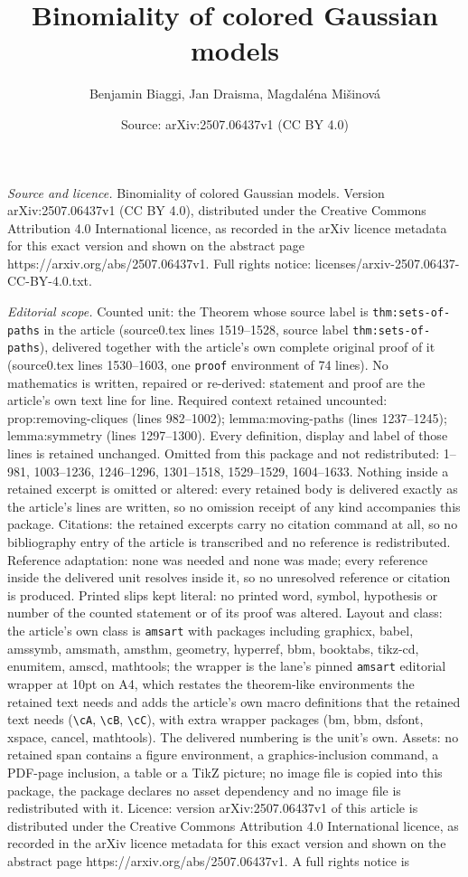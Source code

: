 \documentclass[10pt,a4paper]{amsart}
\title[Binomiality of colored Gaussian models]{Binomiality of colored Gaussian models}
\author{Benjamin Biaggi, Jan Draisma, Magdal\'ena Mi\v{s}inov\'a}
\date{Source: arXiv:2507.06437v1 (CC BY 4.0)}
\begin{document}
\maketitle

\noindent\emph{Source and licence.} Binomiality of colored Gaussian models. Version arXiv:2507.06437v1 (CC BY 4.0), distributed under the Creative Commons Attribution 4.0 International licence, as recorded in the arXiv licence metadata for this exact version and shown on the abstract page https://arxiv.org/abs/2507.06437v1. Full rights notice: licenses/arxiv-2507.06437-CC-BY-4.0.txt.\par\smallskip

\noindent\textit{Editorial scope.} Counted unit: the Theorem whose source label is \texttt{thm:sets-of-paths} in the article (source0.tex lines 1519--1528, source label \texttt{thm:sets-of-paths}), delivered together with the article's own complete original proof of it (source0.tex lines 1530--1603, one \texttt{proof} environment of 74 lines). No mathematics is written, repaired or re-derived: statement and proof are the article's own text line for line. Required context retained uncounted: prop:removing-cliques (lines 982--1002); lemma:moving-paths (lines 1237--1245); lemma:symmetry (lines 1297--1300). Every definition, display and label of those lines is retained unchanged. Omitted from this package and not redistributed: 1--981, 1003--1236, 1246--1296, 1301--1518, 1529--1529, 1604--1633. Nothing inside a retained excerpt is omitted or altered: every retained body is delivered exactly as the article's lines are written, so no omission receipt of any kind accompanies this package. Citations: the retained excerpts carry no citation command at all, so no bibliography entry of the article is transcribed and no reference is redistributed. Reference adaptation: none was needed and none was made; every reference inside the delivered unit resolves inside it, so no unresolved reference or citation is produced. Printed slips kept literal: no printed word, symbol, hypothesis or number of the counted statement or of its proof was altered. Layout and class: the article's own class is \texttt{amsart} with packages including graphicx, babel, amssymb, amsmath, amsthm, geometry, hyperref, bbm, booktabs, tikz-cd, enumitem, amscd, mathtools; the wrapper is the lane's pinned \texttt{amsart} editorial wrapper at 10pt on A4, which restates the theorem-like environments the retained text needs and adds the article's own macro definitions that the retained text needs (\texttt{\textbackslash cA}, \texttt{\textbackslash cB}, \texttt{\textbackslash cC}), with extra wrapper packages (bm, bbm, dsfont, xspace, cancel, mathtools). The delivered numbering is the unit's own. Assets: no retained span contains a figure environment, a graphics-inclusion command, a PDF-page inclusion, a table or a TikZ picture; no image file is copied into this package, the package declares no asset dependency and no image file is redistributed with it. Licence: version arXiv:2507.06437v1 of this article is distributed under the Creative Commons Attribution 4.0 International licence, as recorded in the arXiv licence metadata for this exact version and shown on the abstract page https://arxiv.org/abs/2507.06437v1. A full rights notice is 
\end{document}
